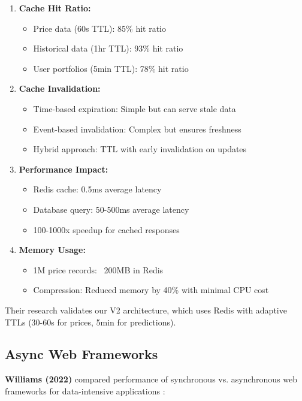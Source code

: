 \documentclass[conference]{IEEEtran}
\begin{document}
\begin{enumerate}
    \item \textbf{Cache Hit Ratio:}
    \begin{itemize}
        \item Price data (60s TTL): 85\% hit ratio
        \item Historical data (1hr TTL): 93\% hit ratio
        \item User portfolios (5min TTL): 78\% hit ratio
    \end{itemize}
    
    \item \textbf{Cache Invalidation:}
    \begin{itemize}
        \item Time-based expiration: Simple but can serve stale data
        \item Event-based invalidation: Complex but ensures freshness
        \item Hybrid approach: TTL with early invalidation on updates
    \end{itemize}
    
    \item \textbf{Performance Impact:}
    \begin{itemize}
        \item Redis cache: 0.5ms average latency
        \item Database query: 50-500ms average latency
        \item 100-1000x speedup for cached responses
    \end{itemize}
    
    \item \textbf{Memory Usage:}
    \begin{itemize}
        \item 1M price records: ~200MB in Redis
        \item Compression: Reduced memory by 40\% with minimal CPU cost
    \end{itemize}
\end{enumerate}

Their research validates our V2 architecture, which uses Redis with adaptive TTLs (30-60s for prices, 5min for predictions).

\subsection{Async Web Frameworks}

\textbf{Williams (2022)} compared performance of synchronous vs. asynchronous web frameworks for data-intensive applications \cite{williams2022async}:
\end{document}
